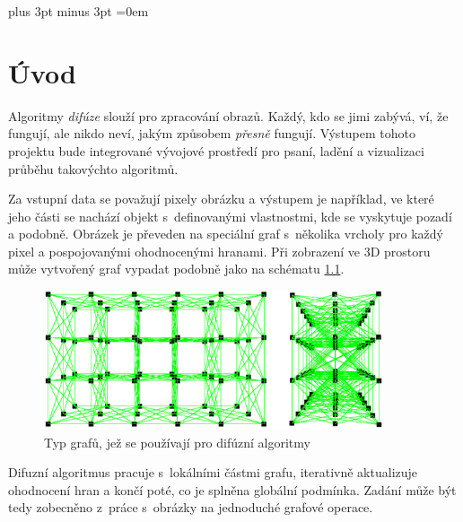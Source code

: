 \documentclass[11pt,twoside,a4paper]{book}
\begin{document}

\cleardoublepage

\tableofcontents
\listoffigures
\listoftables



\mainbodystarts

\parskip=5pt plus 3pt minus 3pt
\parindent=0em



\chapter{Úvod}

Algoritmy \textit{difúze} slouží pro zpracování obrazů. Každý, kdo se jimi zabývá, ví, že fungují, ale nikdo neví, jakým způsobem \textit{přesně} fungují. Výstupem tohoto projektu bude integrované vývojové prostředí pro psaní, ladění a vizualizaci průběhu takovýchto algoritmů.

Za vstupní data se považují pixely obrázku a výstupem je například, ve které jeho části se nachází objekt s~definovanými vlastnostmi, kde se vyskytuje pozadí a podobně. Obrázek je převeden na speciální graf s~několika vrcholy pro každý pixel a pospojovanými ohodnocenými hranami. Při zobrazení ve 3D prostoru může vytvořený graf vypadat podobně jako na schématu \ref{fig:graf_difuze}.

\begin{figure}[ht]
\begin{center}
\includegraphics[width=10cm]{img/graf_difuze.pdf}
\caption{Typ grafů, jež se používají pro difúzní algoritmy}
\label{fig:graf_difuze}
\end{center}
\end{figure}

Difuzní algoritmus pracuje s~lokálními částmi grafu, iterativně aktualizuje ohodnocení hran a končí poté, co je splněna globální podmínka. Zadání může být tedy zobecněno z~práce s~obrázky na jednoduché grafové operace.
\end{document}
